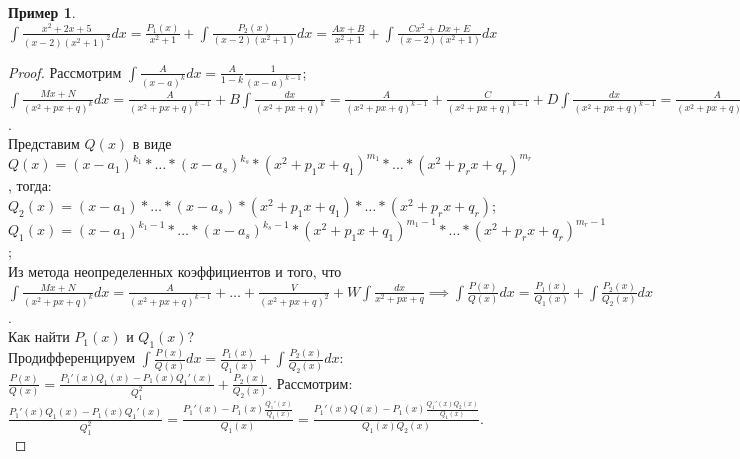 \documentclass{report}
\theoremstyle{definition}
\newtheorem{example}{Пример}
\begin{document}
\begin{example}
  $\int \frac{x^{2} + 2x + 5}{(x-2)(x^{2} + 1)^{2}}dx = \frac{P_{1}(x)}{x^{2} + 1} + \int \frac{P_{2}(x)}{(x-2)(x^{2}+1)}dx
    = \frac{Ax + B}{x^{2} + 1} + \int \frac{Cx^{2} + Dx + E}{(x-2)(x^{2}+1)}dx$
\end{example}

\begin{proof}
  Рассмотрим $\int \frac{A}{(x-a)^{k}} dx = \frac{A}{1 - k} \frac{1}{(x-a)^{k-1}}$; \\

  $\int \frac{Mx + N}{(x^{2} + px + q)^{k}} dx = \frac{A}{(x^{2} + px + q)^{k-1}} + B\int \frac{dx}{(x^{2}+px+q)^{k}} =
    \frac{A}{(x^{2} + px + q)^{k-1}} + \frac{C}{(x^{2} + px + q)^{k-1}} + D\int \frac{dx}{(x^{2} + px + q)^{k-1}} =
    \frac{A}{(x^{2} + px + q)^{k-1}} + \ldots + \frac{V}{(x^{2} + px + q)^{2}} + W\int \frac{dx}{x^{2} + px + q}$.\\

  Представим $Q(x)$ в виде $Q(x) = (x-a_{1})^{k_{1}} * \ldots * (x-a_{s})^{k_{s}} * (x^{2} + p_{1}x + q_{1})^{m_{1}} *
    \ldots * (x^{2} + p_{r}x + q_{r})^{m_{r}}$, тогда: \\

  $Q_{2}(x) = (x-a_{1}) * \ldots * (x-a_{s}) * (x^{2} + p_{1}x + q_{1}) * \ldots * (x^{2} + p_{r}x + q_{r})$;\\

  $Q_{1}(x) = (x-a_{1})^{k_{1}-1} * \ldots * (x-a_{s})^{k_{s}-1} * (x^{2} + p_{1}x + q_{1})^{m_{1}-1} * \ldots *
    (x^{2} + p_{r}x + q_{r})^{m_{r}-1}$;\\

  Из метода неопределенных коэффициентов и того, что $\int \frac{Mx + N}{(x^{2} + px + q)^{k}} dx = \frac{A}
    {(x^{2} + px + q)^{k-1}} + \ldots + \frac{V}{(x^{2} + px + q)^{2}} + W\int \frac{dx}{x^{2} + px + q} \implies
    \int \frac{P(x)}{Q(x)} dx = \frac{P_{1}(x)}{Q_{1}(x)} + \int \frac{P_{2}(x)}{Q_{2}(x)} dx$. \\

  Как найти $P_{1}(x)$ и $Q_{1}(x)$?\\

  Продифференцируем $\int \frac{P(x)}{Q(x)}dx = \frac{P_{1}(x)}{Q_{1}(x)} + \int \frac{P_{2}(x)}{Q_{2}(x)}dx$: \\

  $\frac{P(x)}{Q(x)} = \frac{P_{1}'(x) Q_{1}(x) - P_{1}(x)Q_{1}'(x)}{Q_{1}^{2}} + \frac{P_{2}(x)}{Q_{2}(x)}$.
  Рассмотрим: $\frac{P_{1}'(x) Q_{1}(x) - P_{1}(x)Q_{1}'(x)}{Q_{1}^{2}} = \frac{P_{1}'(x) - P_{1}(x)
      \frac{Q_{1}'(x)}{Q_{1}(x)}}{Q_{1}(x)} = \frac{P_{1}'(x)Q(x) - P_{1}(x)\frac{Q_{1}'(x)Q_{2}(x)}{Q_{1}(x)}}
    {Q_{1}(x)Q_{2}(x)}$.\\


\end{proof}
\end{document}
